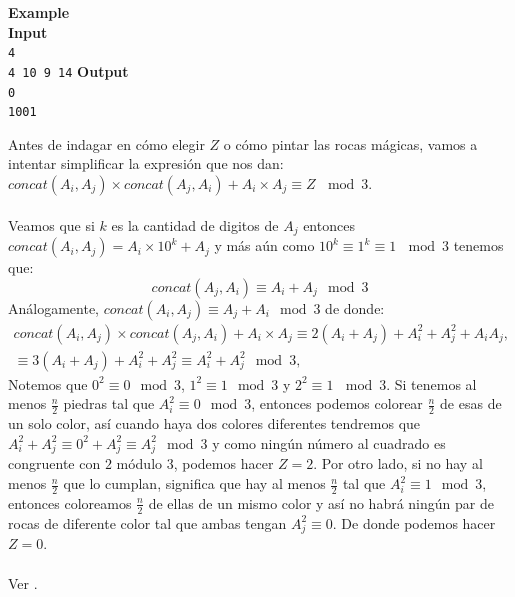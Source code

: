 \begin{center}
{\begin{minipage}{0.95\linewidth}
\vspace{0.5em}
\textbf{Example}\\
\textbf{Input}\\
\texttt{4}\\
\texttt{4 10 9 14}
\vspace{0.5em}
\textbf{Output}\\
\texttt{0}\\
\texttt{1001}
\end{minipage}
}
\end{center}
    Antes de indagar en cómo elegir $Z$ o cómo pintar las rocas mágicas, vamos a intentar simplificar la expresión que nos dan: $concat(A_i, A_j) \times concat(A_j, A_i) + A_i \times A_j \equiv Z \, \mod 3$.
    \\\\Veamos que si $k$ es la cantidad de digitos de $A_j$ entonces $concat(A_i, A_j)=A_i \times 10^k + A_j$ y más aún como $10^k \equiv 1^k \equiv 1\, \mod 3$ tenemos que:
    \[concat(A_j, A_i)\equiv A_i+A_j  \mod 3\]
    Análogamente, $concat(A_i, A_j)\equiv A_j+A_i  \mod 3$ de donde:
    \begin{align*}
    concat(A_i, A_j) \times concat(A_j, A_i) + A_i \times A_j \equiv2(A_i+A_j)+A_i^2+A_j^2 + A_iA_j,\\
    \equiv 3(A_i+A_j)+A_i^2+A_j^2\equiv A_i^2+A_j^2  \mod3,
    \end{align*}
    Notemos que $0^2\equiv 0  \mod 3$, $1^2 \equiv 1  \mod 3$ y $2^2 \equiv 1 \, \mod 3$. Si tenemos al menos $\frac{n}{2}$ piedras tal que $A_i^2\equiv 0  \mod 3$, entonces podemos colorear $\frac{n}{2}$ de esas de un solo color, así cuando haya dos colores diferentes tendremos que $A_i^2+A_j^2\equiv 0^2 +A_j^2 \equiv A_j^2  \mod 3$ y como ningún número al cuadrado es congruente con $2$ módulo $3$, podemos hacer $Z=2$. Por otro lado, si no hay al menos $\frac{n}{2}$ que lo cumplan, significa que hay al menos $\frac{n}{2}$ tal que $A_i^2 \equiv 1  \mod 3$, entonces coloreamos $\frac{n}{2}$ de ellas de un mismo color y así no habrá ningún par de rocas de diferente color tal que ambas tengan $A_j^2 \equiv 0$. De donde podemos hacer $Z=0$.
    \\\\
    Ver .
